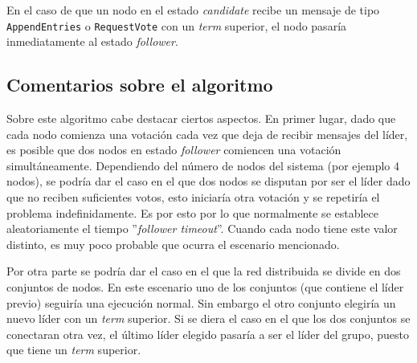 En el caso de que un nodo en el estado \textit{candidate} recibe un mensaje de tipo \texttt{AppendEntries} o \texttt{RequestVote} con un \textit{term} superior, el nodo pasaría inmediatamente al estado \textit{follower}.

\subsection*{Comentarios sobre el algoritmo}

Sobre este algoritmo cabe destacar ciertos aspectos. En primer lugar, dado que cada nodo comienza una votación cada vez que deja de recibir mensajes del líder, es posible que dos nodos en estado \textit{follower} comiencen una votación simultáneamente. Dependiendo del número de nodos del sistema (por ejemplo 4 nodos), se podría dar el caso en el que dos nodos se disputan por ser el líder dado que no reciben suficientes votos, esto iniciaría otra votación y se repetiría el problema indefinidamente. Es por esto por lo que normalmente se establece aleatoriamente el tiempo ''\textit{follower timeout}''. Cuando cada nodo tiene este valor distinto, es muy poco probable que ocurra el escenario mencionado.

Por otra parte se podría dar el caso en el que la red distribuida se divide en dos conjuntos de nodos. En este escenario uno de los conjuntos (que contiene el líder previo) seguiría una ejecución normal. Sin embargo el otro conjunto elegiría un nuevo líder con un \textit{term} superior. Si se diera el caso en el que los dos conjuntos se conectaran otra vez, el último líder elegido pasaría a ser el líder del grupo, puesto que tiene un \textit{term} superior.












